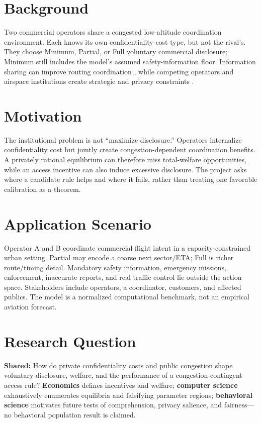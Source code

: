 \section{Background}
Two commercial operators share a congested low-altitude coordination environment. Each knows its own confidentiality-cost type, but not the rival's. They choose Minimum, Partial, or Full voluntary commercial disclosure; Minimum still includes the model's assumed safety-information floor. Information sharing can improve routing coordination \cite{los2020value}, while competing operators and airspace institutions create strategic and privacy constraints \cite{liu2022efficient,maheshwari2025privacy}.

\section{Motivation}
The institutional problem is not “maximize disclosure.” Operators internalize confidentiality cost but jointly create congestion-dependent coordination benefits. A privately rational equilibrium can therefore miss total-welfare opportunities, while an access incentive can also induce excessive disclosure. The project asks where a candidate rule helps and where it fails, rather than treating one favorable calibration as a theorem.

\section{Application Scenario}
Operator A and B coordinate commercial flight intent in a capacity-constrained urban setting. Partial may encode a coarse next sector/ETA; Full is richer route/timing detail. Mandatory safety information, emergency missions, enforcement, inaccurate reports, and real traffic control lie outside the action space. Stakeholders include operators, a coordinator, customers, and affected publics. The model is a normalized computational benchmark, not an empirical aviation forecast.

\section{Research Question}
\textbf{Shared:} How do private confidentiality costs and public congestion shape voluntary disclosure, welfare, and the performance of a congestion-contingent access rule? \textbf{Economics} defines incentives and welfare; \textbf{computer science} exhaustively enumerates equilibria and falsifying parameter regions; \textbf{behavioral science} motivates future tests of comprehension, privacy salience, and fairness---no behavioral population result is claimed.

